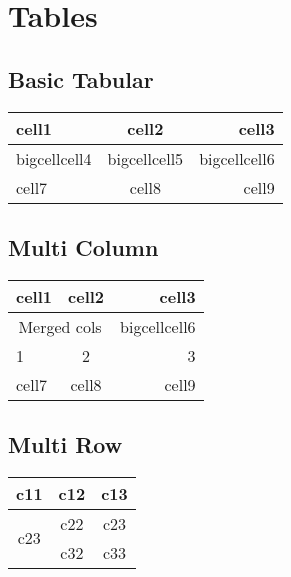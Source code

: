\documentclass{article}
\begin{document}
\section{Tables}
    \subsection{Basic Tabular}
        \begin{tabular}{ | l | c | r | }
        \hline
         cell1 & cell2 & cell3 \\ 
         \hline
         bigcellcell4 & bigcellcell5 & bigcellcell6 \\  
         \cline{1-2}
         cell7 & cell8 & cell9    \\
         \hline
        \end{tabular}
    \subsection{Multi Column}
        \begin{tabular}{ | l | c | r | }
        \hline
         cell1 & cell2 & cell3 \\ 
         \hline
         \multicolumn{2}{|c|}{Merged cols} & bigcellcell6 \\  
         \hline
         1 & 2 & 3 \\
         \cline{1-2}
         cell7 & cell8 & cell9    \\
         \hline
        \end{tabular}
    \subsection{Multi Row}
        \begin{tabular}{|c|c|c|}
            \hline
            c11 & c12 & c13 \\
             \hline
            \multirow{2}{*}{c23} & c22 & c23 \\
            \cline{2-3}
             & c32 & c33 \\
            \hline
        \end{tabular}
\end{document}
